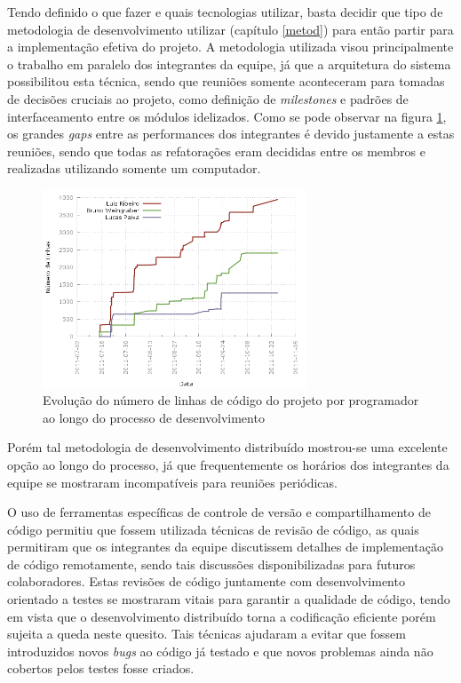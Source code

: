 Tendo definido o que fazer e quais tecnologias utilizar, basta decidir que tipo de metodologia de desenvolvimento utilizar (capítulo \ref{metod}) para então partir para a implementação efetiva do projeto. 
A metodologia utilizada visou principalmente o trabalho em paralelo dos integrantes da equipe, já que a arquitetura do sistema possibilitou esta técnica, sendo que reuniões somente aconteceram para tomadas de decisões cruciais ao projeto, como definição de \emph{milestones} e padrões de interfaceamento entre os módulos idelizados.
Como se pode observar na figura \ref{fig:linhascodigoporautor}, os grandes \emph{gaps} entre as performances dos integrantes é devido justamente a estas reuniões, sendo que todas as refatorações eram decididas entre os membros e realizadas utilizando somente um computador.

\begin{figure}[!htb]
	\centering
	\includegraphics[width=0.7\textwidth]{./plots/lines_of_code_by_author.png}
	\caption[Evolução do número de linhas de código por programador]{Evolução do número de linhas de código do projeto por programador ao longo do processo de desenvolvimento}
	\label{fig:linhascodigoporautor}
\end{figure}

Porém tal metodologia de desenvolvimento distribuído mostrou-se uma excelente opção ao longo do processo, já que frequentemente os horários dos integrantes da equipe se mostraram incompatíveis para reuniões periódicas.

O uso de ferramentas específicas de controle de versão e compartilhamento de código permitiu que fossem utilizada técnicas de revisão de código, as quais permitiram que os integrantes da equipe discutissem detalhes de implementação de código remotamente, sendo tais discussões disponibilizadas para futuros colaboradores. 
Estas revisões de código juntamente com desenvolvimento orientado a testes se mostraram vitais para garantir a qualidade de código, tendo em vista que o desenvolvimento distribuído torna a codificação eficiente porém sujeita a queda neste quesito.
Tais técnicas ajudaram a evitar que fossem introduzidos novos \emph{bugs} ao código já testado e que novos problemas ainda não cobertos pelos testes fosse criados.

